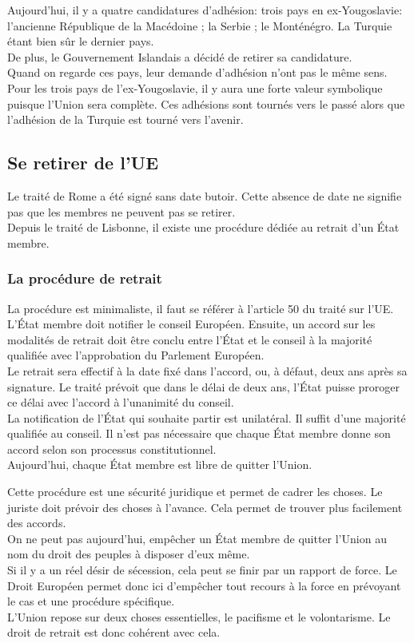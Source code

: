 \documentclass[12pt, a4paper, openany]{book}
\begin{document}
Aujourd'hui, il y a quatre candidatures d'adhésion: trois pays en ex-Yougoslavie: l'ancienne République de la Macédoine ; la Serbie ; le Monténégro. La Turquie étant bien sûr le dernier pays. \\
De plus, le Gouvernement Islandais a décidé de retirer sa candidature. \\
Quand on regarde ces pays, leur demande d'adhésion n'ont pas le même sens. Pour les trois pays de l'ex-Yougoslavie, il y aura une forte valeur symbolique puisque l'Union sera complète. Ces adhésions sont tournés vers le passé alors que l'adhésion de la Turquie est tourné vers l'avenir.  

\subsection{Se retirer de l'UE}

Le traité de Rome a été signé sans date butoir. Cette absence de date ne signifie pas que les membres ne peuvent pas se retirer. \\
Depuis le traité de Lisbonne, il existe une procédure dédiée au retrait d'un État membre. 

\subsubsection{La procédure de retrait}

La procédure est minimaliste, il faut se référer à l'article 50 du traité sur l'UE. L'État membre doit notifier le conseil Européen. Ensuite, un accord sur les modalités de retrait doit être conclu entre l'État et le conseil à la majorité qualifiée avec l'approbation du Parlement Européen. \\
Le retrait sera effectif à la date fixé dans l'accord, ou, à défaut, deux ans après sa signature. Le traité prévoit que dans le délai de deux ans, l'État puisse proroger ce délai avec l'accord à l'unanimité du conseil. \\
La notification de l'État qui souhaite partir est unilatéral. Il suffit d'une majorité qualifiée au conseil. Il n'est pas nécessaire que chaque État membre donne son accord selon son processus constitutionnel. \\
Aujourd'hui, chaque État membre est libre de quitter l'Union.


Cette procédure est une sécurité juridique et permet de cadrer les choses. Le juriste doit prévoir des choses à l'avance. Cela permet de trouver plus facilement des accords. \\
On ne peut pas aujourd'hui, empêcher un État membre de quitter l'Union au nom du droit des peuples à disposer d'eux même. \\
Si il y a un réel désir de sécession, cela peut se finir par un rapport de force. Le Droit Européen permet donc ici d'empêcher tout recours à la force en prévoyant le cas et une procédure spécifique. \\
L'Union repose sur deux choses essentielles, le pacifisme et le volontarisme. Le droit de retrait est donc cohérent avec cela. 
\end{document}
